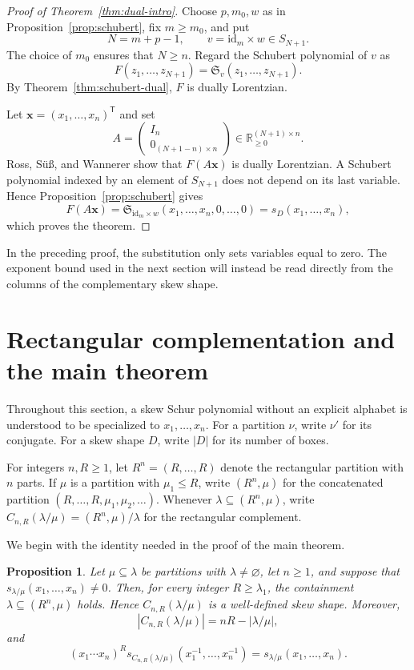 \documentclass[11pt]{article}
\newtheorem{proposition}[theorem]{Proposition}
\theoremstyle{definition}
\newcommand{\Schubert}{\mathfrak S}
\newcommand{\R}{\mathbb R}
\begin{document}
\begin{proof}[Proof of Theorem~\ref{thm:dual-intro}]
Choose $p,m_0,w$ as in Proposition~\ref{prop:schubert}, fix
$m\ge m_0$, and put
\[
  N=m+p-1,
  \qquad
  v=\mathrm{id}_m\times w\in S_{N+1}.
\]
The choice of $m_0$ ensures that $N\ge n$.
Regard the Schubert polynomial of $v$ as
\[
  F(z_1,\ldots,z_{N+1})
  =\Schubert_v(z_1,\ldots,z_{N+1}).
\]
By Theorem~\ref{thm:schubert-dual}, $F$ is dually Lorentzian.

Let $\mathbf x=(x_1,\ldots,x_n)^{\mathsf T}$ and set
\[
  A=
  \begin{pmatrix}
    I_n\\
    0_{(N+1-n)\times n}
  \end{pmatrix}
  \in\R_{\ge0}^{(N+1)\times n}.
\]
Ross, S\"u\ss, and Wannerer \cite[Theorem~5.12]{RSW} show that
$F(A\mathbf x)$ is dually Lorentzian.  A Schubert polynomial indexed by an
element of $S_{N+1}$ does not depend on its last variable.  Hence
Proposition~\ref{prop:schubert} gives
\[
  F(A\mathbf x)
  =\Schubert_{\mathrm{id}_m\times w}
    (x_1,\ldots,x_n,0,\ldots,0)
  =s_D(x_1,\ldots,x_n),
\]
which proves the theorem.
\end{proof}

In the preceding proof, the substitution only sets variables equal to zero.
The exponent bound used in the next section will instead be read directly
from the columns of the complementary skew shape.

\section{Rectangular complementation and the main theorem}
\label{sec:rectangular-complement}

Throughout this section, a skew Schur polynomial without an explicit
alphabet is understood to be specialized to $x_1,\ldots,x_n$.
For a partition $\nu$, write $\nu'$ for its conjugate.  For a skew shape $D$,
write $|D|$ for its number of boxes.

For integers $n,R\ge1$, let
$R^n=(R,\ldots,R)$ denote the rectangular partition with $n$ parts.  If $\mu$
is a partition with $\mu_1\le R$, write
$(R^n,\mu)$ for the concatenated partition
$(R,\ldots,R,\mu_1,\mu_2,\ldots)$.  Whenever
$\lambda\subseteq(R^n,\mu)$, write
$C_{n,R}(\lambda/\mu)=(R^n,\mu)/\lambda$ for the rectangular complement.

We begin with the identity needed in the proof of the main theorem.

\begin{proposition}\label{prop:complement}
Let $\mu\subseteq\lambda$ be partitions with $\lambda\ne\varnothing$, let
$n\ge1$, and suppose that
$s_{\lambda/\mu}(x_1,\ldots,x_n)\ne0$.  Then, for every integer
$R\ge\lambda_1$, the containment $\lambda\subseteq(R^n,\mu)$ holds.  Hence
$C_{n,R}(\lambda/\mu)$ is a well-defined skew shape.  Moreover,
\[
  |C_{n,R}(\lambda/\mu)|=nR-|\lambda/\mu|,
\]
and
\begin{equation}\label{eq:complement-reverse}
  (x_1\cdots x_n)^R
  s_{C_{n,R}(\lambda/\mu)}(x_1^{-1},\ldots,x_n^{-1})
  =s_{\lambda/\mu}(x_1,\ldots,x_n).
\end{equation}
\end{proposition}
\end{document}
